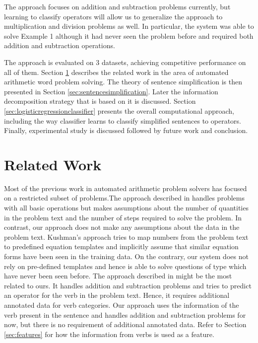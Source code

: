 \documentclass[11pt]{article}
\begin{document}
The approach focuses on addition and subtraction problems currently, but learning to classify operators will allow us to generalize the approach to multiplication and division problems as well. In particular, the system was able to solve Example 1 although it had never seen the problem before and required both addition and subtraction operations.

The approach is evaluated on 3 datasets, achieving competitive performance on all of them. Section \ref{sec:relatedwork} describes the related work in the area of automated arithmetic word problem solving. The theory of sentence simplification is then presented in Section \ref{sec:sentencesimplification}. Later the information decomposition strategy that is based on it is discussed. Section \ref{sec:logisticregressionclassifier} presents the overall computational approach, including the way classifier learns to classify simplified sentences to operators. Finally, experimental study is discussed followed by future work and conclusion.

\section{Related Work} \label{sec:relatedwork}
Most of the previous work in automated arithmetic problem solvers has focused on a restricted subset of problems.The approach described in \citep{RoyTACL15} handles problems with all basic operations but makes assumptions about the number of quantities in the problem text and the number of steps required to solve the problem. In contrast, our approach does not make any assumptions about the data in the problem text. Kushman's approach \citep{Kushman} tries to map numbers from the problem text to predefined equation templates and implicitly assume that similar equation forms have been seen in the training data. On the contrary, our system does not rely on pre-defined templates and hence is able to solve questions of type which have never been seen before.  The approach described in \citep{ARIS} might be the most related to ours. It handles addition and subtraction problems and tries to predict an operator for the verb in the problem text. Hence, it requires additional annotated data for verb categories. Our approach uses the information of the verb present in the sentence and handles addition and subtraction problems for now, but there is no requirement of additional annotated data. Refer to Section \ref{sec:features} for how the information from verbs is used as a feature. 
\end{document}
